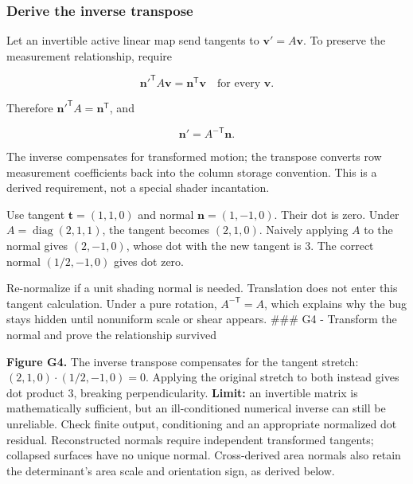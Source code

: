 \subsubsection{Derive the inverse transpose}\label{01-foundations-i-ch018-derive-the-inverse-transpose}

\hypertarget{01-foundations-i-ch018-derive-the-inverse-transpose}{}

Let an invertible active linear map send tangents to \(\mathbf v'=A\mathbf v\). To preserve the measurement relationship, require

\[
\mathbf n'^\mathsf TA\mathbf v=\mathbf n^\mathsf T\mathbf v
\quad\text{for every }\mathbf v.
\]

Therefore \(\mathbf n'^\mathsf TA=\mathbf n^\mathsf T\), and

\[
\mathbf n'=A^{-\mathsf T}\mathbf n.
\]

The inverse compensates for transformed motion; the transpose converts row measurement coefficients back into the column storage convention. This is a derived requirement, not a special shader incantation.

Use tangent \(\mathbf t=(1,1,0)\) and normal \(\mathbf n=(1,-1,0)\). Their dot is zero. Under \(A=\operatorname{diag}(2,1,1)\), the tangent becomes \((2,1,0)\). Naively applying \(A\) to the normal gives \((2,-1,0)\), whose dot with the new tangent is \(3\). The correct normal \((1/2,-1,0)\) gives dot zero.

Re-normalize if a unit shading normal is needed. Translation does not enter this tangent calculation. Under a pure rotation, \(A^{-\mathsf T}=A\), which explains why the bug stays hidden until nonuniform scale or shear appears. \#\#\# G4 - Transform the normal and prove the relationship survived


\textbf{Figure G4.} The inverse transpose compensates for the tangent stretch: \((2,1,0)\cdot(1/2,-1,0)=0\). Applying the original stretch to both instead gives dot product \(3\), breaking perpendicularity. \textbf{Limit:} an invertible matrix is mathematically sufficient, but an ill-conditioned numerical inverse can still be unreliable. Check finite output, conditioning and an appropriate normalized dot residual. Reconstructed normals require independent transformed tangents; collapsed surfaces have no unique normal. Cross-derived area normals also retain the determinant's area scale and orientation sign, as derived below.

